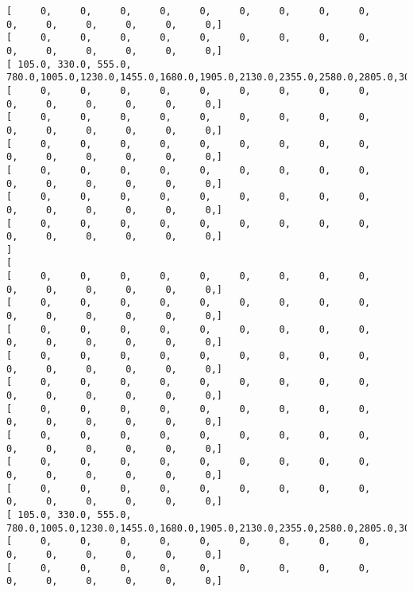 \documentclass[11pt]{article}
\begin{document}
\begin{Verbatim}[commandchars=\\\{\}]
[      0,      0,      0,      0,      0,      0,      0,      0,      0,      0,      0,      0,      0,      0,      0, ]
[      0,      0,      0,      0,      0,      0,      0,      0,      0,      0,      0,      0,      0,      0,      0, ]
[  105.0,  330.0,  555.0,  780.0, 1005.0, 1230.0, 1455.0, 1680.0, 1905.0, 2130.0, 2355.0, 2580.0, 2805.0, 3030.0, 3255.0, ]
[      0,      0,      0,      0,      0,      0,      0,      0,      0,      0,      0,      0,      0,      0,      0, ]
[      0,      0,      0,      0,      0,      0,      0,      0,      0,      0,      0,      0,      0,      0,      0, ]
[      0,      0,      0,      0,      0,      0,      0,      0,      0,      0,      0,      0,      0,      0,      0, ]
[      0,      0,      0,      0,      0,      0,      0,      0,      0,      0,      0,      0,      0,      0,      0, ]
[      0,      0,      0,      0,      0,      0,      0,      0,      0,      0,      0,      0,      0,      0,      0, ]
[      0,      0,      0,      0,      0,      0,      0,      0,      0,      0,      0,      0,      0,      0,      0, ]
]
[
[      0,      0,      0,      0,      0,      0,      0,      0,      0,      0,      0,      0,      0,      0,      0, ]
[      0,      0,      0,      0,      0,      0,      0,      0,      0,      0,      0,      0,      0,      0,      0, ]
[      0,      0,      0,      0,      0,      0,      0,      0,      0,      0,      0,      0,      0,      0,      0, ]
[      0,      0,      0,      0,      0,      0,      0,      0,      0,      0,      0,      0,      0,      0,      0, ]
[      0,      0,      0,      0,      0,      0,      0,      0,      0,      0,      0,      0,      0,      0,      0, ]
[      0,      0,      0,      0,      0,      0,      0,      0,      0,      0,      0,      0,      0,      0,      0, ]
[      0,      0,      0,      0,      0,      0,      0,      0,      0,      0,      0,      0,      0,      0,      0, ]
[      0,      0,      0,      0,      0,      0,      0,      0,      0,      0,      0,      0,      0,      0,      0, ]
[      0,      0,      0,      0,      0,      0,      0,      0,      0,      0,      0,      0,      0,      0,      0, ]
[  105.0,  330.0,  555.0,  780.0, 1005.0, 1230.0, 1455.0, 1680.0, 1905.0, 2130.0, 2355.0, 2580.0, 2805.0, 3030.0, 3255.0, ]
[      0,      0,      0,      0,      0,      0,      0,      0,      0,      0,      0,      0,      0,      0,      0, ]
[      0,      0,      0,      0,      0,      0,      0,      0,      0,      0,      0,      0,      0,      0,      0, ]

\end{Verbatim}
\end{document}
